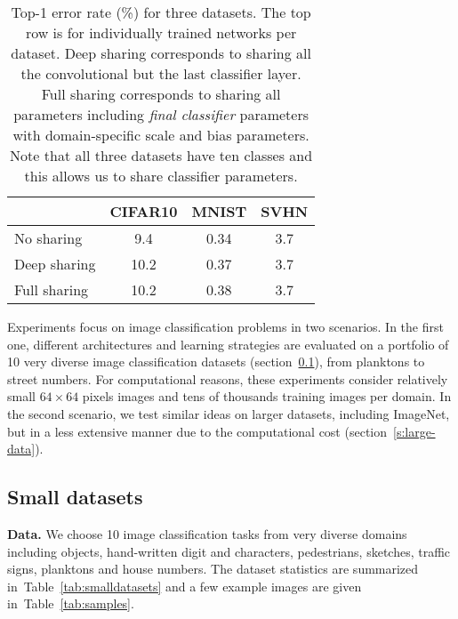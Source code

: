 \documentclass[10pt,twocolumn,letterpaper]{article}
\renewcommand{\paragraph}[1]{\par\medskip\noindent\textbf{#1}}
\begin{document}
 \begin{table}[t]
	\centering
	\begin{tabular}{lccc}
		\toprule
		& CIFAR10 & MNIST & SVHN\\
		\midrule
		No sharing & 9.4 & 0.34 & 3.7\\
		Deep sharing & 10.2 & 0.37 & 3.7\\
		Full sharing & 10.2 & 0.38 & 3.7\\
		\bottomrule
	\end{tabular}
	\caption{Top-1 error rate (\%) for three datasets. The top row is for individually trained networks per dataset. Deep sharing corresponds to sharing all the convolutional but the last classifier layer. Full sharing corresponds to sharing all parameters including \emph{final classifier} parameters with domain-specific scale and bias parameters. Note that all three datasets have ten classes and this allows us to share classifier parameters.}
	\label{tab:shareclassifier}
\end{table} 
Experiments focus on image classification problems in two scenarios. In the first one, different architectures and learning strategies are evaluated on a portfolio of 10 very diverse image classification datasets (section~\ref{s:small}), from planktons to street numbers. For computational reasons, these experiments consider relatively small $64\times 64$ pixels images and tens of thousands training images per domain. In the second scenario, we test similar ideas on larger datasets, including ImageNet, but in a less extensive manner due to the computational cost (section~\ref{s:large-data}).

\subsection{Small datasets}\label{s:small}

\paragraph{Data.} We choose 10 image classification tasks from very diverse domains including objects, hand-written digit and characters, pedestrians, sketches, traffic signs, planktons and house numbers. The dataset statistics are summarized in~Table~\ref{tab:smalldatasets} and a few example images are given in~Table~\ref{tab:samples}.
\end{document}
